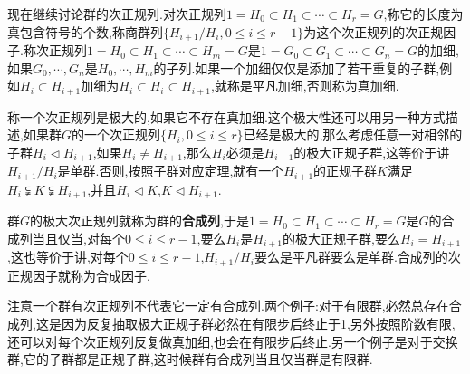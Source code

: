 现在继续讨论群的次正规列.对次正规列$1=H_0\subset H_1\subset\cdots\subset H_r=G$,称它的长度为真包含符号的个数,称商群列$\{H_{i+1}/H_i,0\le i\le r-1\}$为这个次正规列的次正规因子.称次正规列$1=H_0\subset H_1\subset\cdots\subset H_m=G$是$1=G_0\subset G_1\subset\cdots\subset G_n=G$的加细,如果$G_0,\cdots,G_n$是$H_0,\cdots,H_m$的子列.如果一个加细仅仅是添加了若干重复的子群,例如$H_i\subset H_{i+1}$加细为$H_i\subset H_i\subset H_{i+1}$,就称是平凡加细,否则称为真加细.

称一个次正规列是极大的,如果它不存在真加细.这个极大性还可以用另一种方式描述,如果群$G$的一个次正规列$\{H_i,0\le i\le r\}$已经是极大的,那么考虑任意一对相邻的子群$H_i\triangleleft H_{i+1}$,如果$H_i\not=H_{i+1}$,那么$H_i$必须是$H_{i+1}$的极大正规子群,这等价于讲$H_{i+1}/H_i$是单群.否则,按照子群对应定理,就有一个$H_{i+1}$的正规子群$K$满足$H_i\subsetneqq K\subsetneqq H_{i+1}$,并且$H_i\triangleleft K$,$K\triangleleft H_{i+1}$.

群$G$的极大次正规列就称为群的\textbf{合成列},于是$1=H_0\subset H_1\subset\cdots\subset H_r=G$是$G$的合成列当且仅当,对每个$0\le i\le r-1$,要么$H_i$是$H_{i+1}$的极大正规子群,要么$H_i=H_{i+1}$,这也等价于讲,对每个$0\le i\le r-1$,$H_{i+1}/H_i$要么是平凡群要么是单群.合成列的次正规因子就称为合成因子.

注意一个群有次正规列不代表它一定有合成列.两个例子:对于有限群,必然总存在合成列,这是因为反复抽取极大正规子群必然在有限步后终止于1,另外按照阶数有限,还可以对每个次正规列反复做真加细,也会在有限步后终止.另一个例子是对于交换群,它的子群都是正规子群,这时候群有合成列当且仅当群是有限群.

